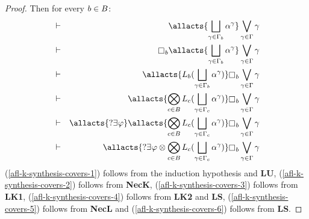 \begin{proof}
    Then for every $b \in B$: 
    \begin{eqnarray}
        &\proves& \allacts{\bigchoice_{\gamma \in \Gamma_\agentB} \alpha^\gamma} \bigvee_{\gamma \in \Gamma} \gamma\label{afl-k-synthesis-covers-1}\\
        &\proves& \necessary_\agentB \allacts{\bigchoice_{\gamma \in \Gamma_\agentB} \alpha^\gamma} \bigvee_{\gamma \in \Gamma} \gamma\label{afl-k-synthesis-covers-2}\\
        &\proves& \allacts{\learns_\agentB (\bigchoice_{\gamma \in \Gamma_\agentB} \alpha^\gamma)} \necessary_\agentB \bigvee_{\gamma \in \Gamma} \gamma\label{afl-k-synthesis-covers-3}\\
        &\proves& \allacts{\bigcompose_{\agentC \in \agentsB} \learns_\agentC (\bigchoice_{\gamma \in \Gamma_\agentC} \alpha^\gamma)} \necessary_\agentB \bigvee_{\gamma \in \Gamma} \gamma\label{afl-k-synthesis-covers-4}\\
        &\proves& \allacts{\test{\somerefs \phi}} \allacts{\bigcompose_{\agentC \in \agentsB} \learns_\agentC (\bigchoice_{\gamma \in \Gamma_\agentC} \alpha^\gamma)} \necessary_\agentB \bigvee_{\gamma \in \Gamma} \gamma\label{afl-k-synthesis-covers-5}\\
        &\proves& \allacts{\test{\somerefs \phi} \compose \bigcompose_{\agentC \in \agentsB} \learns_\agentC (\bigchoice_{\gamma \in \Gamma_\agentC} \alpha^\gamma)} \necessary_\agentB \bigvee_{\gamma \in \Gamma} \gamma\label{afl-k-synthesis-covers-6}
    \end{eqnarray}
    (\ref{afl-k-synthesis-covers-1}) follows from the induction hypothesis and {\bf LU},
    (\ref{afl-k-synthesis-covers-2}) follows from {\bf NecK},
    (\ref{afl-k-synthesis-covers-3}) follows from {\bf LK1},
    (\ref{afl-k-synthesis-covers-4}) follows from {\bf LK2} and {\bf LS},
    (\ref{afl-k-synthesis-covers-5}) follows from {\bf NecL} and
    (\ref{afl-k-synthesis-covers-6}) follows from {\bf LS}.


\end{proof}
